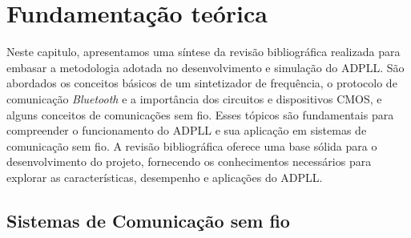 \chapter{Fundamentação teórica}
Neste capitulo, apresentamos uma síntese da revisão bibliográfica realizada para embasar a metodologia adotada no desenvolvimento e simulação do ADPLL. São abordados os conceitos básicos de um sintetizador de frequência, o protocolo de comunicação \textit{Bluetooth} e a importância dos circuitos e dispositivos CMOS, e alguns conceitos de comunicações sem fio. Esses tópicos são fundamentais para compreender o funcionamento do ADPLL e sua aplicação em sistemas de comunicação sem fio. A revisão bibliográfica oferece uma base sólida para o desenvolvimento do projeto, fornecendo os conhecimentos necessários para explorar as características, desempenho e aplicações do ADPLL.


\section{Sistemas de Comunicação sem fio}
%
%
%


